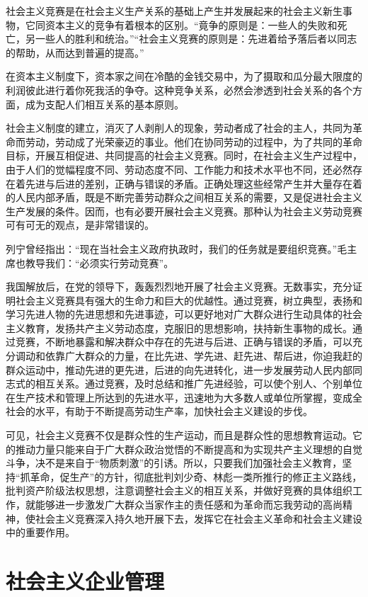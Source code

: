 \documentclass{book}
\begin{document}
社会主义竞赛是在社会主义生产关系的基础上产生并发展起来的社会主义新生事物，它同资本主义的竞争有着根本的区别。“竟争的原则是：一些人的失败和死亡，另一些人的胜利和统治。”“社会主义竞赛的原则是：先进着给予落后者以同志的帮助，从而达到普遍的提高。”

在资本主义制度下，资本家之间在冷酷的金钱交易中，为了摄取和瓜分最大限度的利润彼此进行着你死我活的争夺。这种竞争关系，必然会渗透到社会关系的各个方面，成为支配人们相互关系的基本原则。

社会主义制度的建立，消灭了人剥削人的现象，劳动者成了社会的主人，共同为革命而劳动，劳动成了光荣豪迈的事业。他们在协同劳动的过程中，为了共同的革命目标，开展互相促进、共同提高的社会主义竞赛。同时，在社会主义生产过程中，由于人们的觉幅程度不同、劳动态度不同、工作能力和技术水平也不同，还必然存在着先进与后进的差别，正确与错误的矛盾。正确处理这些经常产生并大量存在着的人民内部矛盾，既是不断完善劳动群众之间相互关系的需要，又是促进社会主义生产发展的条件。因而，也有必要开展社会主义竞赛。那种认为社会主义劳动竞赛可有可无的观点，是非常错误的。

列宁曾经指出：“现在当社会主义政府执政时，我们的任务就是要组织竞赛。”毛主席也教导我们：“必须实行劳动竞赛”。

我国解放后，在党的领导下，轰轰烈烈地开展了社会主义竞赛。无数事实，充分证明社会主义竞赛具有强大的生命力和巨大的优越性。通过竞赛，树立典型，表扬和学习先进人物的先进思想和先进事迹，可以更好地对广大群众进行生动具体的社会主义教育，发扬共产主义劳动态度，克服旧的思想影响，扶持新生事物的成长。通过竞赛，不断地暴露和解决群众中存在的先进与后进、正确与错误的矛盾，可以充分调动和依靠广大群众的力量，在比先进、学先进、赶先进、帮后进，你迫我赶的群众运动中，推动先进的更先进，后进的向先进转化，进一步发展劳动人民内部同志式的相互关系。通过竞赛，及时总结和推广先进经验，可以使个别人、个别单位在生产技术和管理上所达到的先进水平，迅速地为大多数人或单位所掌握，变成全社会的水平，有助于不断提高劳动生产率，加快社会主义建设的步伐。

可见，社会主义竞赛不仅是群众性的生产运动，而且是群众性的思想教育运动。它的推动力量只能来自于广大群众政治觉悟的不断提高和为实现共产主义理想的自觉斗争，决不是来自于“物质刺激”的引诱。所以，只要我们加强社会主义教育，坚持“抓革命，促生产”的方针，彻底批判刘少奇、林彪一类所推行的修正主义路线，批判资产阶级法权思想，注意调整社会主义的相互关系，并做好竞赛的具体组织工作，就能够进一步激发广大群众当家作主的责任感和为革命而忘我劳动的高尚精神，使社会主义竞赛深入持久地开展下去，发挥它在社会主义革命和社会主义建设中的重要作用。

\section{社会主义企业管理}
\end{document}

